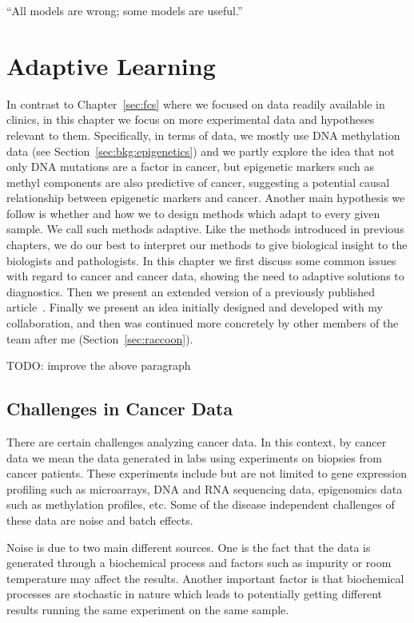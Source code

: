 \begin{savequote}[.5\linewidth]
  ``All models are wrong; some models are useful.''
\end{savequote}

\chapter{Adaptive Learning}
\label{sec:adaptive-learning}

In contrast to Chapter~\ref{sec:fcs} where we focused on data readily available in clinics, in this chapter we focus on more experimental data and hypotheses relevant to them. Specifically, in terms of data, we mostly use DNA methylation data (see Section~\ref{sec:bkg:epigenetics}) and we partly explore the idea that not only DNA mutations are a factor in cancer, but epigenetic markers such as methyl components are also predictive of cancer, suggesting a potential causal relationship between epigenetic markers and cancer. Another main hypothesis we follow is whether and how we to design methods which adapt to every given sample. We call such methods adaptive. Like the methods introduced in previous chapters, we do our best to interpret our methods to give biological insight to the biologists and pathologists. In this chapter we first discuss some common issues with regard to cancer and cancer data, showing the need to adaptive solutions to diagnostics. Then we present an extended version of a previously published article~\cite{jalali2016interpretable}. Finally we present an idea initially designed and developed with my collaboration, and then was continued more concretely by other members of the team after me (Section~\ref{sec:raccoon}).

TODO: improve the above paragraph 

\section{Challenges in Cancer Data}
There are certain challenges analyzing cancer data. In this context, by cancer data we mean the data generated in labs using experiments on biopsies from cancer patients. These experiments include but are not limited to gene expression profiling such as microarrays, DNA and RNA sequencing data, epigenomics data such as methylation profiles, etc. Some of the disease independent challenges of these data are noise and batch effects. 

Noise is due to two main different sources. One is the fact that the data is generated through a biochemical process and factors such as impurity or room temperature may affect the results. Another important factor is that biochemical processes are stochastic in nature which leads to potentially getting different results running the same experiment on the same sample.


